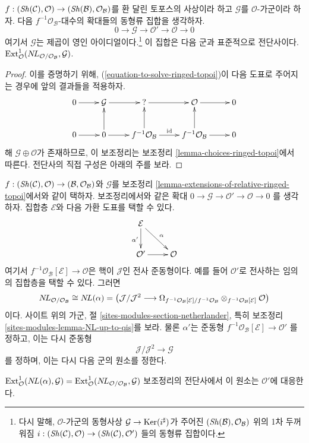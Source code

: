 \begin{lemma}
\label{lemma-extensions-of-relative-ringed-topoi}
$f : (\mathop{\mathit{Sh}}\nolimits(\mathcal{C}), \mathcal{O}) \to
(\mathop{\mathit{Sh}}\nolimits(\mathcal{B}), \mathcal{O}_\mathcal{B})$를 환 달린 토포스의
사상이라 하고 $\mathcal{G}$를 $\mathcal{O}$-가군이라 하자. 다음
$f^{-1}\mathcal{O}_\mathcal{B}$-대수의 확대들의 동형류 집합을 생각하자.
$$
0 \to \mathcal{G} \to \mathcal{O}' \to \mathcal{O} \to 0
$$
여기서 $\mathcal{G}$는 제곱이 영인 아이디얼이다.\footnote{다시 말해,
$\mathcal{O}$-가군의 동형사상
$\mathcal{G} \to \mathop{\mathrm{Ker}}(i^\sharp)$가 주어진
$(\mathop{\mathit{Sh}}\nolimits(\mathcal{B}), \mathcal{O}_\mathcal{B})$ 위의 1차 두꺼워짐
$i : (\mathop{\mathit{Sh}}\nolimits(\mathcal{C}), \mathcal{O}) \to (\mathop{\mathit{Sh}}\nolimits(\mathcal{C}), \mathcal{O}')$
들의 동형류 집합이다.}
이 집합은 다음 군과 표준적으로 전단사이다.
$\mathop{\mathrm{Ext}}\nolimits^1_\mathcal{O}(\mathop{N\!L}\nolimits_{\mathcal{O}/\mathcal{O}_\mathcal{B}}, \mathcal{G})$.
\end{lemma}

\begin{proof}
이를 증명하기 위해, (\ref{equation-to-solve-ringed-topoi})이 다음
도표로 주어지는 경우에 앞의 결과들을 적용하자.
$$
\xymatrix{
0 \ar[r] &
\mathcal{G} \ar[r] &
{?} \ar[r] &
\mathcal{O} \ar[r] & 0 \\
0 \ar[r] &
0 \ar[u] \ar[r] &
f^{-1}\mathcal{O}_\mathcal{B} \ar[u] \ar[r]^{\text{id}} &
f^{-1}\mathcal{O}_\mathcal{B} \ar[u] \ar[r] & 0
}
$$
해 $\mathcal{G} \oplus \mathcal{O}$가 존재하므로, 이 보조정리는
보조정리 \ref{lemma-choices-ringed-topoi}에서 따른다. 전단사의 직접
구성은 아래의 주를 보라.
\end{proof}

\begin{remark}
\label{remark-extensions-of-relative-ringed-topoi}
$f : (\mathop{\mathit{Sh}}\nolimits(\mathcal{C}), \mathcal{O}) \to
(\mathcal{B}, \mathcal{O}_\mathcal{B})$와 $\mathcal{G}$를 보조정리
\ref{lemma-extensions-of-relative-ringed-topoi}에서와 같이 택하자.
보조정리에서와 같은 확대
$0 \to \mathcal{G} \to \mathcal{O}' \to \mathcal{O} \to 0$
를 생각하자. 집합층 $\mathcal{E}$와 다음 가환 도표를 택할 수 있다.
$$
\xymatrix{
\mathcal{E} \ar[d]_{\alpha'} \ar[rd]^\alpha \\
\mathcal{O}' \ar[r] & \mathcal{O}
}
$$
여기서 $f^{-1}\mathcal{O}_\mathcal{B}[\mathcal{E}] \to \mathcal{O}$은
핵이 $\mathcal{J}$인 전사 준동형이다. 예를 들어 $\mathcal{O}'$로
전사하는 임의의 집합층을 택할 수 있다. 그러면
$$
\mathop{N\!L}\nolimits_{\mathcal{O}/\mathcal{O}_\mathcal{B}} \cong \mathop{N\!L}\nolimits(\alpha) = 
\left(
\mathcal{J}/\mathcal{J}^2
\longrightarrow
\Omega_{f^{-1}\mathcal{O}_\mathcal{B}[\mathcal{E}]/
f^{-1}\mathcal{O}_\mathcal{B}}
\otimes_{f^{-1}\mathcal{O}_\mathcal{B}[\mathcal{E}]} \mathcal{O}\right)
$$
이다. 사이트 위의 가군, 절 \ref{sites-modules-section-netherlander},
특히 보조정리 \ref{sites-modules-lemma-NL-up-to-qis}를 보라. 물론
$\alpha'$는 준동형
$f^{-1}\mathcal{O}_\mathcal{B}[\mathcal{E}] \to \mathcal{O}'$
를 정하고, 이는 다시 준동형
$$
\mathcal{J}/\mathcal{J}^2 \longrightarrow \mathcal{G}
$$
를 정하며, 이는 다시 다음 군의 원소를 정한다.\par\noindent
$\mathop{\mathrm{Ext}}\nolimits^1_\mathcal{O}(\mathop{N\!L}\nolimits(\alpha), \mathcal{G}) =
\mathop{\mathrm{Ext}}\nolimits^1_\mathcal{O}(\mathop{N\!L}\nolimits_{\mathcal{O}/\mathcal{O}_\mathcal{B}}, \mathcal{G})$
보조정리의 전단사에서 이 원소는 $\mathcal{O}'$에 대응한다.
\end{remark}


